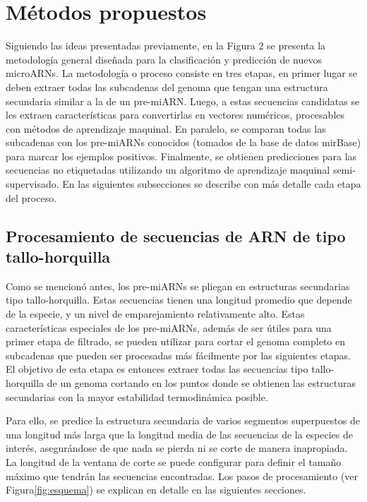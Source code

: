 \chapter{Métodos propuestos}
Siguiendo las ideas presentadas previamente, en la Figura 2 se presenta la metodología general diseñada para la clasificación y predicción de nuevos
microARNs. La metodología o proceso consiste en tres etapas, en primer lugar se deben extraer todas las subcadenas del genoma que tengan una estructura
secundaria similar a la de un pre-miARN. Luego, a estas secuencias candidatas se les extraen características para convertirlas en vectores numéricos,
procesables con métodos de aprendizaje maquinal. En paralelo, se comparan todas las subcadenas con los pre-miARNs conocidos (tomados de la base de datos mirBase)
para marcar los ejemplos positivos. Finalmente, se obtienen predicciones para las secuencias no etiquetadas utilizando un algoritmo de aprendizaje maquinal
semi-supervisado. En las siguientes subsecciones se describe con más detalle cada etapa del proceso.

\section{Procesamiento de secuencias de ARN de tipo tallo-horquilla}
Como se mencionó antes, los pre-miARNs se pliegan en estructuras secundarias tipo tallo-horquilla. Estas secuencias tienen una longitud promedio que depende
de la especie, y un nivel de emparejamiento relativamente alto. Estas características especiales de los pre-miARNs, además de ser útiles para una primer
etapa de filtrado, se pueden utilizar para cortar el genoma completo en subcadenas que pueden ser procesadas más fácilmente por las siguientes etapas. El
objetivo de esta etapa es entonces extraer todas las secuencias tipo tallo-horquilla de un genoma cortando en los puntos donde se obtienen las estructuras
secundarias con la mayor estabilidad termodinámica posible.

Para ello, se predice la estructura secundaria de varios segmentos superpuestos de una longitud más larga que la longitud media de las secuencias de la especies
de interés, asegurándose de que nada se pierda ni se corte de manera inapropiada. La longitud de la ventana de corte se puede configurar para definir el tamaño
máximo que tendrán las secuencias encontradas. Los pasos de procesamiento (ver Figura\ref{fig:esquema}) se explican en detalle en las siguientes secciones.

